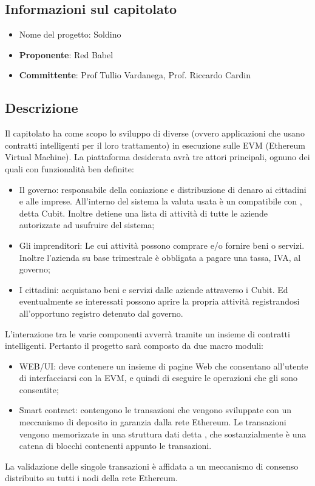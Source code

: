 \subsection{Informazioni sul capitolato}
    \begin{itemize}
        \item Nome del progetto: Soldino
        \item \textbf{Proponente}: Red Babel
        \item \textbf{Committente}: Prof Tullio Vardanega, Prof. Riccardo Cardin
    \end{itemize}
\subsection{Descrizione}
Il capitolato ha come scopo lo sviluppo di diverse  (ovvero applicazioni che usano contratti intelligenti per il loro trattamento)
in esecuzione sulle EVM (Ethereum Virtual Machine). La piattaforma desiderata avrà tre attori principali, ognuno dei quali con funzionalità ben definite: 
\begin{itemize}
        \item Il governo: responsabile della coniazione e distribuzione di denaro ai cittadini e alle imprese. All'interno del sistema la valuta usata è un  compatibile con , detta Cubit. Inoltre detiene una lista di attività di tutte le aziende autorizzate ad usufruire del sistema;
	   
        \item Gli imprenditori: Le cui attività possono comprare e/o fornire 
        beni o servizi.
	    Inoltre l'azienda su base trimestrale è obbligata a pagare una tassa, IVA, al governo;

        \item I cittadini: acquistano beni e servizi dalle aziende attraverso i Cubit. Ed eventualmente se interessati possono aprire la propria attività registrandosi all'opportuno registro detenuto dal governo.
       
    \end{itemize}
L'interazione tra le varie componenti avverrà tramite un insieme di contratti intelligenti.
Pertanto il progetto sarà composto da due macro moduli:
    \begin{itemize}
        \item WEB/UI: deve contenere un insieme di pagine Web che consentano all'utente di interfacciarsi con la EVM, e quindi di eseguire le operazioni che gli sono consentite;
    
        \item Smart contract: contengono le transazioni che vengono sviluppate con un meccanismo di deposito in garanzia dalla rete Ethereum. Le transazioni vengono memorizzate in una struttura dati detta , che sostanzialmente è una catena di blocchi contenenti appunto le transazioni. 
    \end{itemize}
La validazione delle singole transazioni è affidata a un meccanismo di consenso distribuito su tutti i nodi della rete Ethereum.


